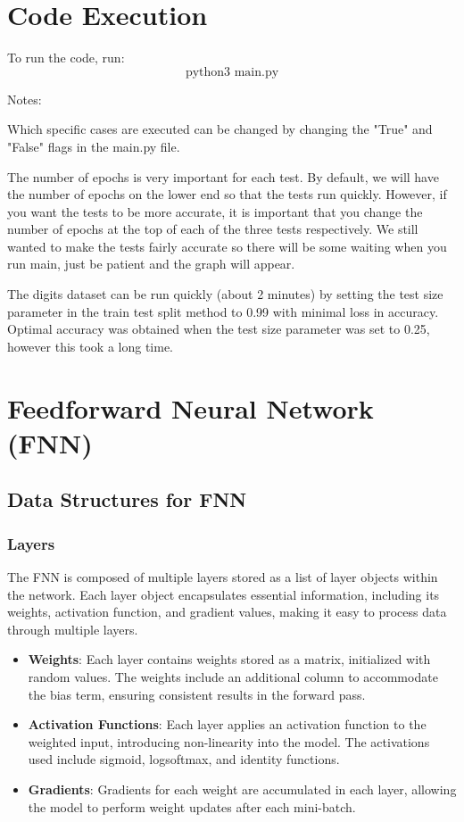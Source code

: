 \documentclass{article}
\begin{document}
\section{Code Execution}

To run the code, run:
\[\text{python3 main.py}\]


Notes: 

Which specific cases are executed can be changed by changing the "True" and "False" flags in the main.py file.

The number of epochs is very important for each test. By default, we will have the number of epochs on the lower end so that the tests run quickly. However, if you want the tests to be more accurate, it is important that you change the number of epochs at the top of each of the three tests respectively. We still wanted to make the tests fairly accurate so there will be some waiting when you run main, just be patient and the graph will appear. 

The digits dataset can be run quickly (about 2 minutes) by setting the test size parameter in the train test split method to 0.99 with minimal loss in accuracy. Optimal accuracy was obtained when the test size parameter was set to 0.25, however this took a long time.


\section{Feedforward Neural Network (FNN)}

\subsection{Data Structures for FNN}

\subsubsection{\textbf{Layers}}
The FNN is composed of multiple layers stored as a list of layer objects within the network. Each layer object encapsulates essential information, including its weights, activation function, and gradient values, making it easy to process data through multiple layers.

\begin{itemize}
    \item \textbf{Weights}: Each layer contains weights stored as a matrix, initialized with random values. The weights include an additional column to accommodate the bias term, ensuring consistent results in the forward pass.
    \item \textbf{Activation Functions}: Each layer applies an activation function to the weighted input, introducing non-linearity into the model. The activations used include sigmoid, logsoftmax, and identity functions.
    \item \textbf{Gradients}: Gradients for each weight are accumulated in each layer, allowing the model to perform weight updates after each mini-batch.
\end{itemize}
\end{document}
